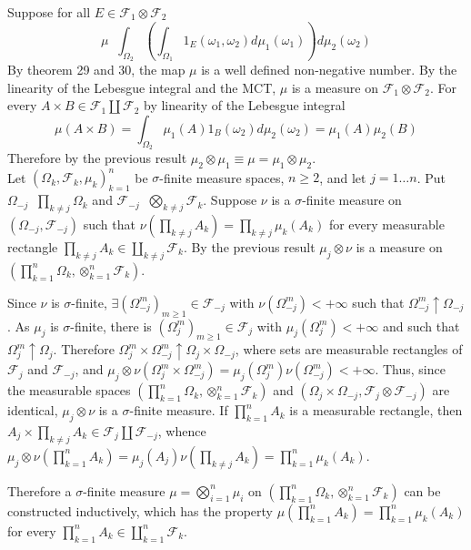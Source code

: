\documentclass[a4paper]{article}
\newcommand{\brac}[1]{\left ( #1 \right )}
\newcommand{\Fcal}{\mathcal{F}}
\newcommand{\defn}{\mathop{\overset{\Delta}{=}}\nolimits}
\begin{document}
Suppose for all $E\in \Fcal_1\otimes\Fcal_2$ \[\mu \defn \int_{\Omega_2} \brac{ \int_{\Omega_1} 1_E\brac{\omega_1, \omega_2 } d\mu_1\brac{\omega_1} } d\mu_2\brac{\omega_2}\] By theorem 29 and 30, the map $\mu$ is a well defined non-negative number. By the linearity of the Lebesgue integral and the MCT, $\mu$ is a measure on $\Fcal_1\otimes\Fcal_2$. For every $A\times B\in \Fcal_1\coprod \Fcal_2$ by linearity of the Lebesgue integral \[\mu\brac{A\times B} = \int_{\Omega_2} \mu_1\brac{A} 1_B\brac{\omega_2} d\mu_2\brac{\omega_2} = \mu_1\brac{A} \mu_2\brac{B}\] Therefore by the previous result $\mu_2\otimes\mu_1 \equiv \mu = \mu_1\otimes\mu_2$.\\

Let $\brac{\Omega_k, \Fcal_k, \mu_k}_{k=1}^n$ be $\sigma$-finite measure spaces, $n\geq 2$, and let $j=1\ldots n$. Put $\Omega_{-j} \defn \prod_{k\neq j} \Omega_k$ and $\Fcal_{-j} \defn \bigotimes_{k\neq j} \Fcal_k$. Suppose $\nu$ is a $\sigma$-finite measure on $\brac{\Omega_{-j}, \Fcal_{-j}}$ such that $\nu\brac{ \prod_{k\neq j} A_k } = \prod_{k\neq j} \mu_k\brac{A_k}$ for every measurable rectangle $\prod_{k\neq j} A_k \in \coprod_{k\neq j} \Fcal_k$. By the previous result $\mu_j\otimes\nu$ is a measure on $\brac{\prod_{k=1}^n\Omega_k,\otimes_{k=1}^n\Fcal_k}$.

Since $\nu$ is $\sigma$-finite, $\exists \brac{\Omega_{-j}^m}_{m\geq 1}\in \Fcal_{-j}$ with $\nu\brac{\Omega_{-j}^m}<+\infty$ such that $\Omega_{-j}^m\uparrow \Omega_{-j}$. As $\mu_j$ is $\sigma$-finite, there is $\brac{\Omega_j^m}_{m\geq 1}\in \Fcal_j$ with $\mu_j\brac{\Omega_j^m}<+\infty$ and such that $\Omega_j^m\uparrow \Omega_j$. Therefore $\Omega_j^m\times\Omega_{-j}^m\uparrow \Omega_j\times\Omega_{-j}$, where sets are measurable rectangles of $\Fcal_j$ and $\Fcal_{-j}$, and $\mu_j\otimes\nu\brac{\Omega_j^m\times\Omega_{-j}^m} = \mu_j\brac{\Omega_j^m} \nu\brac{\Omega_{-j}^m}<+\infty$. Thus, since the measurable spaces $\brac{\prod_{k=1}^n\Omega_k,\otimes_{k=1}^n\Fcal_k}$ and $\brac{\Omega_j\times\Omega_{-j}, \Fcal_j\otimes\Fcal_{-j}}$ are identical, 
$\mu_j\otimes \nu$ is a $\sigma$-finite measure. If $\prod_{k=1}^n A_k$ is a measurable rectangle, then $A_j\times \prod_{k\neq j} A_k \in \Fcal_j\coprod \Fcal_{-j}$, whence $\mu_j\otimes\nu\brac{\prod_{k=1}^n A_k} = \mu_j\brac{A_j} \nu\brac{\prod_{k\neq j} A_k} = \prod_{k=1}^n \mu_k\brac{A_k}$.

Therefore a $\sigma$-finite measure $\mu =\bigotimes_{i=1}^n \mu_i$ on $\brac{\prod_{k=1}^n\Omega_k,\otimes_{k=1}^n\Fcal_k}$ can be constructed inductively, which has the property $\mu\brac{\prod_{k=1}^n A_k} = \prod_{k=1}^n \mu_k\brac{A_k}$ for every $\prod_{k=1}^n A_k\in \coprod_{k=1}^n \Fcal_k$.
\end{document}
